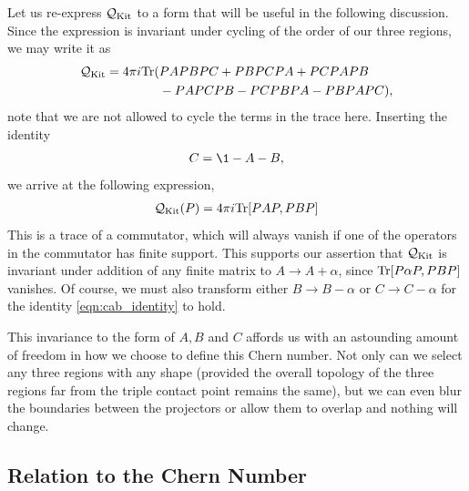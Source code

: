 Let us re-express $\mathcal Q_{\textup{Kit}}$ to a form that will be useful in the following discussion. Since the expression is invariant under cycling of the order of our three regions, we may write it as
\begin{align}
    \mathcal Q_{\textup{Kit}} = 4 \pi i \textup{Tr}(
        &PAPBPC + PBPCPA + PCPAPB \\
        &- PAPCPB - PCPBPA - PBPAPC),
\end{align}
note that we are not allowed to cycle the terms in the trace here. Inserting the identity 
\begin{align}\label{eqn:cab_identity}
    C = \1 - A - B,
\end{align} 
we arrive at the following expression,
\begin{align} \label{eqn:qkit_as_commutator}
    \mathcal Q_{\textup{Kit}}(P) = 4 \pi i \textup{Tr}[
        PAP, PBP
    ]
\end{align}
This is a trace of a commutator, which will always vanish if one of the operators in the commutator has finite support. This supports our assertion that $\mathcal Q_{\textup{Kit}}$ is invariant under addition of any finite matrix to $A \rightarrow A + \alpha$, since $\textup{Tr}[P\alpha P, PBP]$ vanishes. Of course, we must also transform either $B \rightarrow B-\alpha$ or $C \rightarrow C-\alpha$ for the identity \ref{eqn:cab_identity} to hold.

This invariance to the form of $A, B$ and $C$ affords us with an astounding amount of freedom in how we choose to define this Chern number. Not only can we select any three regions with any shape (provided the overall topology of the three regions far from the triple contact point remains the same), but we can even blur the boundaries between the projectors or allow them to overlap and nothing will change.

\subsection{Relation to the Chern Number}

